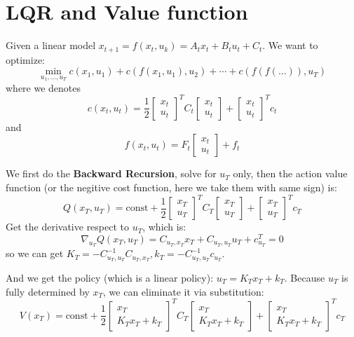 \documentclass[10pt]{elegantbook}
\begin{document}
\section{LQR and Value function}

Given a linear model $x_{t+1} = f(x_t, u_k) = A_t x_t + B_t u_t + C_t$. We want to optimize:
\[ \min_{u_1, \ldots, u_T} c(x_1, u_1) + c(f(x_1, u_1), u_2) + \cdots + c(f(f(\ldots)), u_T) \]
where we denotes 
\[ c(x_t, u_t) = \frac{1}{2} 
\begin{bmatrix}
    x_t \\ 
    u_t
\end{bmatrix}^T C_t 
\begin{bmatrix}
    x_t \\ 
    u_t
\end{bmatrix}
+
\begin{bmatrix}
    x_t \\ 
    u_t
\end{bmatrix}^T c_t
\]
and 
\[ f(x_t, u_t) 
= F_t
\begin{bmatrix}
    x_t \\ 
    u_t
\end{bmatrix}
+ f_t
\]

We first do the \textbf{Backward Recursion}, solve for $u_T$ only, then the action value function (or the negitive cost function, here
we take them with same sign) is:
\[ Q(x_T, u_T) = \text{const} +
\frac{1}{2} 
\begin{bmatrix}
    x_T \\ 
    u_T
\end{bmatrix}^T C_T
\begin{bmatrix}
    x_T \\ 
    u_T
\end{bmatrix} + 
\begin{bmatrix}
    x_T \\ 
    u_T
\end{bmatrix}^T c_T
\]
Get the derivative respect to $u_T$, which is:
\[ \nabla_{u_T} Q(x_T, u_T) = C_{u_T, x_T}x_T + C_{u_T,u_T}u_T + c_{u_T}^T = 0 \]
so we can get $K_T = -C_{u_T,u_T}^{-1}C_{u_T, x_T}, k_T = -C_{u_T,u_T}^{-1}c_{u_T}$.

And we get the policy (which is a linear policy): $u_T = K_Tx_T + k_T$. Because $u_T$ is fully
determined by $x_T$, we can eliminate it via substitution:
\[ V(x_T) = \text{const} + \frac{1}{2} 
\begin{bmatrix}
    x_T \\ 
    K_Tx_T + k_T
\end{bmatrix}^T C_T
\begin{bmatrix}
    x_T \\ 
    K_Tx_T + k_T
\end{bmatrix}
+
\begin{bmatrix}
    x_T \\ 
    K_Tx_T + k_T
\end{bmatrix}^T
c_T
\]
\end{document}
